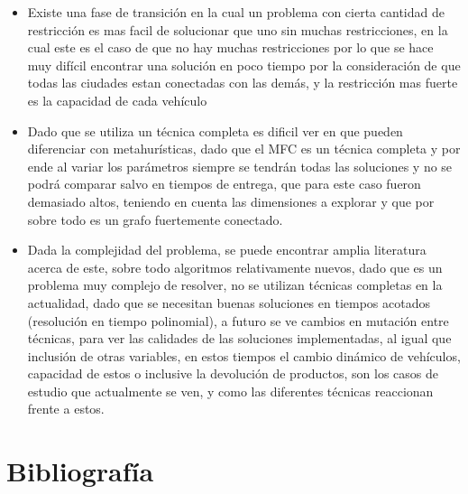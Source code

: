 \documentclass[letter, 10pt]{article}
\begin{document}
\begin{itemize}
 \item Existe una fase de transici\'on en la cual un problema con cierta cantidad de restricci\'on es mas facil de solucionar que uno sin muchas restricciones, en la cual este es el caso de que no hay muchas restricciones por lo que se hace muy dif\'icil encontrar una soluci\'on en poco tiempo por la consideraci\'on de que todas las ciudades estan conectadas con las dem\'as, y la restricci\'on mas fuerte es la capacidad de cada veh\'iculo
 
 \item Dado que se utiliza un t\'ecnica completa es dificil ver en que pueden diferenciar con metahur\'isticas, dado que el MFC es un t\'ecnica completa y por ende al variar los par\'ametros siempre se tendr\'an todas las soluciones y no se podr\'a comparar salvo en tiempos de entrega, que para este caso fueron demasiado altos, teniendo en cuenta las dimensiones a explorar y que por sobre todo es un grafo fuertemente conectado. 
 
 \item Dada la complejidad del problema, se puede encontrar amplia literatura acerca de este, sobre todo algoritmos relativamente nuevos, dado que es un problema muy complejo de resolver, no se utilizan t\'ecnicas completas en la actualidad, dado que se necesitan buenas soluciones en tiempos acotados (resoluci\'on en tiempo polinomial), a futuro se ve cambios en mutaci\'on entre t\'ecnicas, para ver las calidades de las soluciones implementadas, al igual que inclusi\'on de otras variables, en estos tiempos el cambio din\'amico de veh\'iculos, capacidad de estos o inclusive la devoluci\'on de productos, son los casos de estudio que actualmente se ven, y como las diferentes t\'ecnicas reaccionan frente a estos.
 \end{itemize}

\newpage
\section{Bibliograf\'ia}


\end{document}
